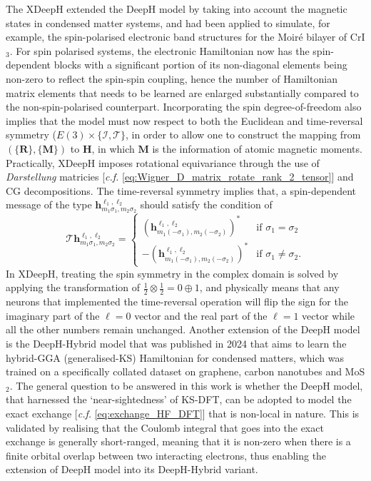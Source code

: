 The XDeepH\cite{Li2023-wf} extended the DeepH model by taking into account the magnetic states in condensed matter systems, and had been applied to simulate, for example, the spin-polarised electronic band structures for the Moir\'{e} bilayer of CrI$_{3}$. For spin polarised systems, the electronic Hamiltonian now has the spin-dependent blocks with a significant portion of its non-diagonal elements being non-zero to reflect the spin-spin coupling, hence the number of Hamiltonian matrix elements that needs to be learned are enlarged substantially compared to the non-spin-polarised counterpart. Incorporating the spin degree-of-freedom also implies that the model must now respect to both the Euclidean and time-reversal symmetry ($E(3)\times\{\mathcal{I},\mathcal{T}\}$, in order to allow one to construct the mapping from $(\{\bm{R}\},\{\bm{M}\})$ to $\bm{H}$, in which $\bm{M}$ is the information of atomic magnetic moments. Practically, XDeepH imposes rotational equivariance through the use of \emph{Darstellung} matricies [\emph{c.f.} \cref{eq:Wigner_D_matrix_rotate_rank_2_tensor}] and CG decompositions. The time-reversal symmetry  implies that,  a spin-dependent message of the type $\bm{h}^{\ell_1,\ell_2}_{m_1\sigma_1,m_2\sigma_2}$ should satisfy the condition of 
\begin{equation*}
\mathcal{T}\bm{h}^{\ell_1,\ell_2}_{m_1\sigma_1,m_2\sigma_2}=\begin{cases}
\left(\bm{h}^{\ell_1,\ell_2}_{m_1(-\sigma_1),m_2(-\sigma_2)}\right)^* &\text{if }  \sigma_1=\sigma_2\\
-\left(\bm{h}^{\ell_1,\ell_2}_{m_1(-\sigma_1),m_2(-\sigma_2)}\right)^* &\text{if }  \sigma_1\neq\sigma_2.
\end{cases}
\end{equation*}
In XDeepH, treating the spin symmetry in the complex domain is solved by applying the transformation of $\frac{1}{2}\otimes\frac{1}{2}=0\oplus 1$, and physically means that any neurons that implemented the time-reversal operation will flip the sign for the imaginary part of the $\ell=0$ vector and the real part of the $\ell=1$ vector while all the other numbers remain unchanged. Another extension of the DeepH model is the DeepH-Hybrid\cite{Tang2024-ek} model that was published in 2024 that aims to learn the hybrid-GGA (generalised-KS) Hamiltonian for condensed matters, which was trained on a specifically collated dataset on graphene, carbon nanotubes and MoS$_2$. The general question to be answered in this work is whether the DeepH model, that harnessed the `near-sightedness' of KS-DFT, can be adopted to model the exact exchange  [\emph{c.f.} \cref{eq:exchange_HF_DFT}] that is non-local in nature. This is validated by realising that the Coulomb integral that goes into the exact exchange is generally short-ranged, meaning that it is non-zero when there is a finite orbital overlap between two interacting electrons, thus enabling the extension of DeepH model into its DeepH-Hybrid variant.

